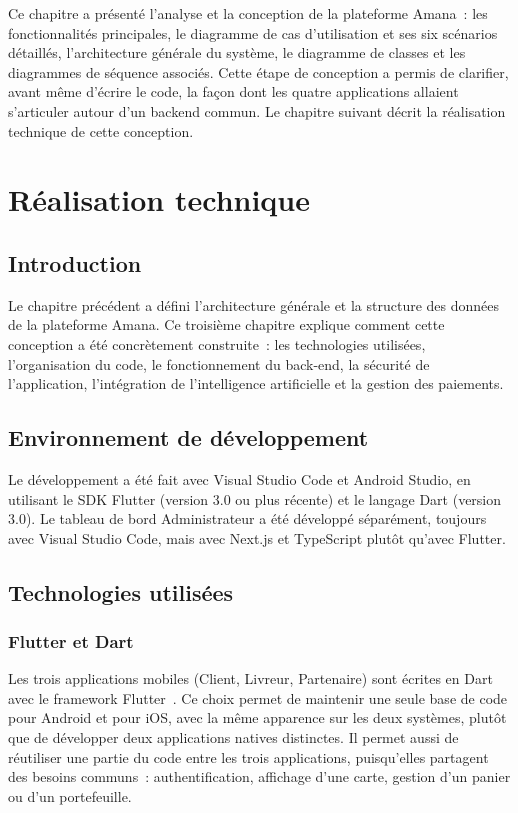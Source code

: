 \documentclass[12pt,fleqn,a4paper]{report}
\begin{document}
\begin{justify}
Ce chapitre a présenté l'analyse et la conception de la plateforme Amana~: les fonctionnalités principales, le diagramme de cas d'utilisation et ses six scénarios détaillés, l'architecture générale du système, le diagramme de classes et les diagrammes de séquence associés. Cette étape de conception a permis de clarifier, avant même d'écrire le code, la façon dont les quatre applications allaient s'articuler autour d'un backend commun. Le chapitre suivant décrit la réalisation technique de cette conception.

\chapter{Réalisation technique}

\section{Introduction}

Le chapitre précédent a défini l'architecture générale et la structure des données de la plateforme Amana. Ce troisième chapitre explique comment cette conception a été concrètement construite~: les technologies utilisées, l'organisation du code, le fonctionnement du back-end, la sécurité de l'application, l'intégration de l'intelligence artificielle et la gestion des paiements.

\section{Environnement de développement}

Le développement a été fait avec Visual Studio Code et Android Studio, en utilisant le SDK Flutter (version 3.0 ou plus récente) et le langage Dart (version 3.0). Le tableau de bord Administrateur a été développé séparément, toujours avec Visual Studio Code, mais avec Next.js et TypeScript plutôt qu'avec Flutter.

\section{Technologies utilisées}

\subsection{Flutter et Dart}

Les trois applications mobiles (Client, Livreur, Partenaire) sont écrites en Dart avec le framework Flutter~\cite{flutter_docs,dart_docs}. Ce choix permet de maintenir une seule base de code pour Android et pour iOS, avec la même apparence sur les deux systèmes, plutôt que de développer deux applications natives distinctes. Il permet aussi de réutiliser une partie du code entre les trois applications, puisqu'elles partagent des besoins communs~: authentification, affichage d'une carte, gestion d'un panier ou d'un portefeuille.


\end{justify}
\end{document}
